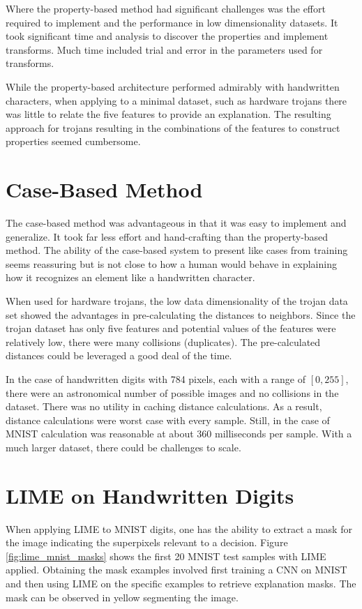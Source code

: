 Where the property-based method had significant challenges was the effort
required to implement and the performance in low dimensionality datasets. It
took significant time and analysis to discover the properties and implement
transforms.  Much time included trial and error in the parameters used for
transforms.

While the property-based architecture performed admirably with handwritten
characters, when applying to a minimal dataset, such as hardware trojans there
was little to relate the five features to provide an explanation.  The resulting
approach for trojans resulting in the combinations of the features to construct
properties seemed cumbersome.

\section{Case-Based Method}

The case-based method was advantageous in that it was easy to implement and
generalize. It took far less effort and hand-crafting than the property-based
method.  The ability of the case-based system to present like cases from
training seems reassuring but is not close to how a human would behave in
explaining how it recognizes an element like a handwritten character. 

When used for hardware trojans, the low data dimensionality of the trojan data
set showed the advantages in pre-calculating the distances to neighbors. Since
the trojan dataset has only five features and potential values of the features
were relatively low, there were many collisions (duplicates). The pre-calculated
distances could be leveraged a good deal of the time.

In the case of handwritten digits with 784 pixels, each with a range of $[0,
255]$, there were an astronomical number of possible images and no collisions in
the dataset. There was no utility in caching distance calculations. As a result,
distance calculations were worst case with every sample.  Still, in the case of
MNIST calculation was reasonable at about 360 milliseconds per sample. With a
much larger dataset, there could be challenges to scale.

\section{LIME on Handwritten Digits}

When applying LIME to MNIST digits, one has the ability to extract a mask for
the image indicating the superpixels relevant to a decision. Figure
\ref{fig:lime_mnist_masks} shows the first 20 MNIST test samples with LIME
applied. Obtaining the mask examples involved first training a CNN on MNIST and
then using LIME on the specific examples to retrieve explanation masks. The mask
can be observed in yellow segmenting the image.

